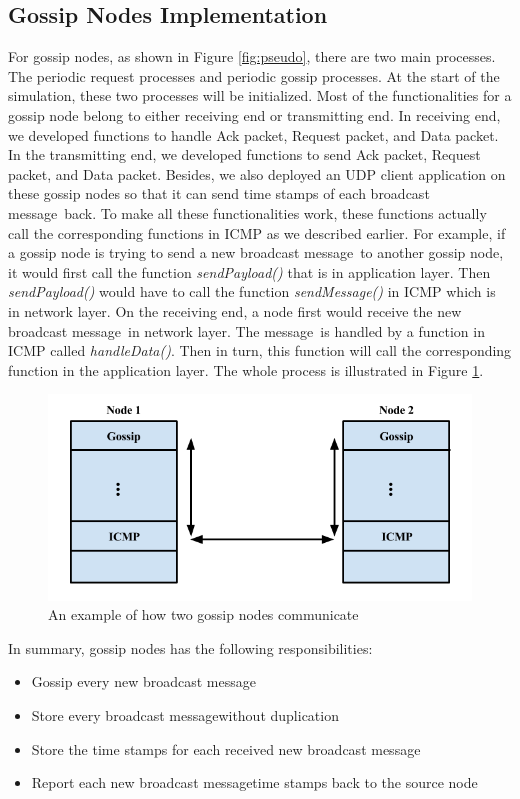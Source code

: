 \documentclass[onehalf,11pt]{beavtex}
\newcommand{\msg}{message}
\begin{document}
\subsection{Gossip Nodes Implementation}
For gossip nodes, as shown in Figure \ref{fig:pseudo}, there are two main processes. The periodic request processes and periodic gossip processes. At the start of the simulation, these two processes will be initialized. Most of the functionalities for a gossip node belong to either receiving end or transmitting end. In receiving end, we developed functions to handle Ack packet, Request packet, and Data packet. In the transmitting end, we developed functions to send Ack packet, Request packet, and Data packet. Besides, we also deployed an UDP client application on these gossip nodes so that it can send time stamps of each broadcast \msg ~back. To make all these functionalities work, these functions actually call the corresponding functions in ICMP as we described earlier. For example, if a gossip node is trying to send a new broadcast \msg ~to another gossip node, it would first call the function \emph{sendPayload()} that is in application layer. Then \emph{sendPayload()} would have to call the function \emph{sendMessage()} in ICMP which is in network layer. On the receiving end, a node first would receive the new broadcast \msg ~in network layer. The \msg ~is handled by a function in ICMP called \emph{handleData()}. Then in turn, this function will call the corresponding function in the application layer. The whole process is illustrated in Figure \ref{fig:topDown}.

\begin{figure}
	\centering
	\includegraphics[width=5.5in]{topDown.png}
	\caption{An example of how two gossip nodes communicate}
	\label{fig:topDown}
\end{figure}

In summary, gossip nodes has the following responsibilities:
\begin{itemize}
	\item Gossip every new broadcast \msg
	\item Store every broadcast \msg without duplication
	\item Store the time stamps for each received new broadcast \msg
	\item Report each new broadcast \msg time stamps back to the source node
\end{itemize}
\end{document}
